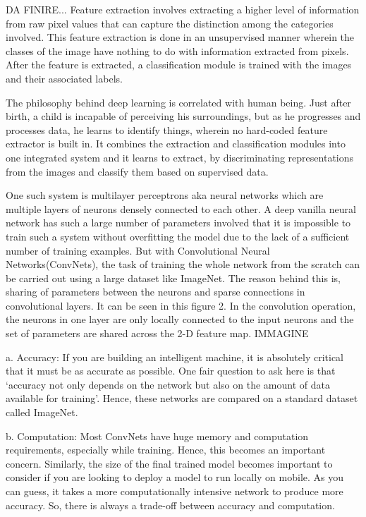 \documentclass[../main.tex]{subfiles}
\begin{document}
DA FINIRE...
Feature extraction involves extracting a higher level of information from raw pixel values that can capture the distinction among the categories involved. This feature extraction is done in an unsupervised manner wherein the classes of the image have nothing to do with information extracted from pixels. After the feature is extracted, a classification module is trained with the images and their associated labels.

The philosophy behind deep learning is correlated with human being. Just after birth, a child is incapable of perceiving his surroundings, but as he progresses and processes data, he learns to identify things, wherein no hard-coded feature extractor is built in. It combines the extraction and classification modules into one integrated system and it learns to extract, by discriminating representations from the images and classify them based on supervised data.

One such system is multilayer perceptrons aka neural networks which are multiple layers of neurons densely connected to each other. A deep vanilla neural network has such a large number of parameters involved that it is impossible to train such a system without overfitting the model due to the lack of a sufficient number of training examples. But with Convolutional Neural Networks(ConvNets), the task of training the whole network from the scratch can be carried out using a large dataset like ImageNet. The reason behind this is, sharing of parameters between the neurons and sparse connections in convolutional layers. It can be seen in this figure 2. In the convolution operation, the neurons in one layer are only locally connected to the input neurons and the set of parameters are shared across the 2-D feature map.
IMMAGINE

a. Accuracy:
If you are building an intelligent machine, it is absolutely critical that it must be as accurate as possible. One fair question to ask here is that ‘accuracy not only depends on the network but also on the amount of data available for training’. Hence, these networks are compared on a standard dataset called ImageNet.

b. Computation:
Most ConvNets have huge memory and computation requirements, especially while training. Hence, this becomes an important concern. Similarly, the size of the final trained model becomes important to consider if you are looking to deploy a model to run locally on mobile. As you can guess, it takes a more computationally intensive network to produce more accuracy. So, there is always a trade-off between accuracy and computation.
\end{document}
